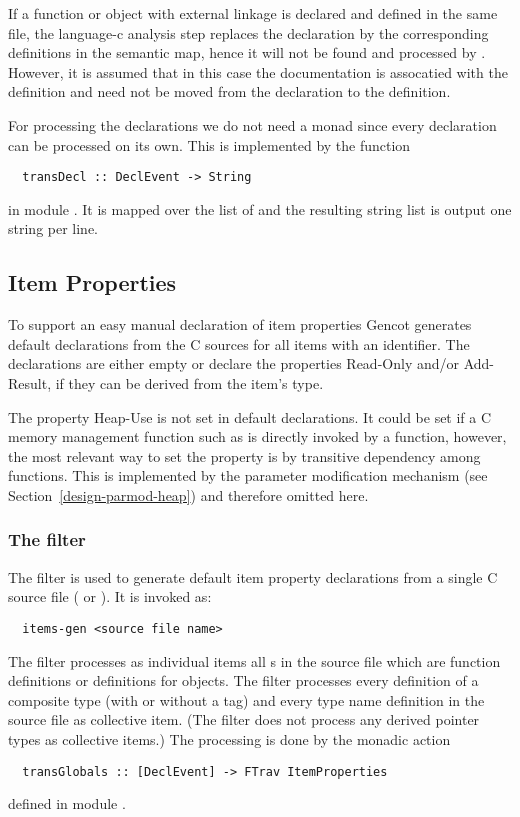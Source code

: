 If a function or object with external linkage is declared and defined in the same file, the language-c analysis step
replaces the declaration by the corresponding definitions in the semantic map, hence it will not be found and processed
by . However, it is assumed that in this case the documentation is assocatied with the definition
and need not be moved from the declaration to the definition.

For processing the declarations we do not need a monad since every declaration can be processed on its own. This is implemented
by the function
\begin{verbatim}
  transDecl :: DeclEvent -> String
\end{verbatim}
in module . It is mapped over the list of  and the resulting string list
is output one string per line.

\subsection{Item Properties}
\label{impl-ccomps-itemprops}

To support an easy manual declaration of item properties Gencot generates default declarations from the C sources for all 
items with an identifier. The declarations are either empty or declare the properties Read-Only and/or Add-Result, if they
can be derived from the item's type. 

The property Heap-Use is not set in default declarations. It could be set if a C memory management function such as  
is directly invoked by a function, however, the most relevant way to set the property is by transitive dependency among functions.
This is implemented by the parameter modification mechanism (see Section~\ref{design-parmod-heap}) and therefore omitted here.

\subsubsection{The filter }

The filter  is used to generate default item property declarations from a single C source file ( or ).
It is invoked as:
\begin{verbatim}
  items-gen <source file name>
\end{verbatim}

The filter processes as individual items all s in the source file which are function
definitions or definitions for objects. The filter processes every definition of a composite type 
(with or without a tag) and every type name definition in the source file as collective item. (The filter does not
process any derived pointer types as collective items.) The processing is done by the monadic action
\begin{verbatim}
  transGlobals :: [DeclEvent] -> FTrav ItemProperties
\end{verbatim}
defined in module .

